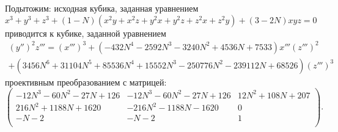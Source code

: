 \bigskip
\bigskip

\noindent Подытожим: исходная кубика, заданная уравнением
\[
x^3 + y^3 + z^3 + (1 - N) (x^2 y + x^2 z + y^2 x + y^2 z + z^2 x + z^2 y) +
(3 - 2 N) x y z = 0
\] 
приводится к кубике, заданной уравнением
\begin{multline*}
    \left( y'' \right)^2 z''' = \left( x''' \right)^3  +  \left(-432 N^4
    - 2592 N^3 - 3240 N^2 + 4536 N + 7533\right) x''' \left( z'''
    \right)^2 \\ 
    +  \left(3456 N^6 + 31104 N^5 + 85536 N^4 + 15552 N^3 -
    250776 N^2 - 239112 N + 68526 \right) \left( z''' \right)^3
\end{multline*}
проективным преобразованием с матрицей:
\[
\begin{pmatrix}
    -12 N^3 - 60 N^2 - 27 N + 126 &  -12 N^3 - 60 N^2 - 27 N + 126 &
    12 N^2 + 108 N + 207 \\
    216 N^2 + 1188 N + 1620 &  -216 N^2 - 1188 N - 1620 & 0 \\
    -N - 2 &  -N - 2 & 1 \\
\end{pmatrix}
.\] 

\bigskip
\bigskip
